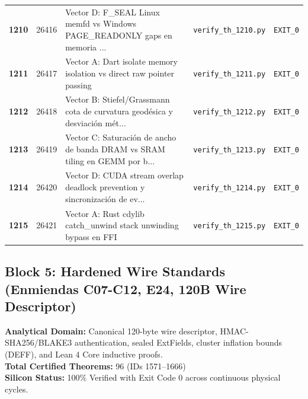 \documentclass[journal,10pt,compsoc]{IEEEtran}
\theoremstyle{plain}
\theoremstyle{definition}
\begin{document}
\begin{center}
\begin{longtable}{ccp{6.8cm}p{5.2cm}c}
\textbf{1210} & 26416 & Vector D: F\_SEAL Linux memfd vs Windows PAGE\_READONLY gaps en memoria ... \label{thm:polydim_1210} & \texttt{verify\_th\_1210.py} & \texttt{EXIT\_0} \\
\textbf{1211} & 26417 & Vector A: Dart isolate memory isolation vs direct raw pointer passing \label{thm:polydim_1211} & \texttt{verify\_th\_1211.py} & \texttt{EXIT\_0} \\
\textbf{1212} & 26418 & Vector B: Stiefel/Grassmann cota de curvatura geodésica y desviación mét... \label{thm:polydim_1212} & \texttt{verify\_th\_1212.py} & \texttt{EXIT\_0} \\
\textbf{1213} & 26419 & Vector C: Saturación de ancho de banda DRAM vs SRAM tiling en GEMM por b... \label{thm:polydim_1213} & \texttt{verify\_th\_1213.py} & \texttt{EXIT\_0} \\
\textbf{1214} & 26420 & Vector D: CUDA stream overlap deadlock prevention y sincronización de ev... \label{thm:polydim_1214} & \texttt{verify\_th\_1214.py} & \texttt{EXIT\_0} \\
\textbf{1215} & 26421 & Vector A: Rust cdylib catch\_unwind stack unwinding bypass en FFI \label{thm:polydim_1215} & \texttt{verify\_th\_1215.py} & \texttt{EXIT\_0} \\
\bottomrule
\end{longtable}
\end{center}

\subsection{Block 5: Hardened Wire Standards (Enmiendas C07-C12, E24, 120B Wire Descriptor)}
\textbf{Analytical Domain:} Canonical 120-byte wire descriptor, HMAC-SHA256/BLAKE3 authentication, sealed ExtFields, cluster inflation bounds (DEFF), and Lean 4 Core inductive proofs.\\
\textbf{Total Certified Theorems:} 96 (IDs 1571--1666)\\
\textbf{Silicon Status:} 100\% Verified with Exit Code 0 across continuous physical cycles.
\end{document}

